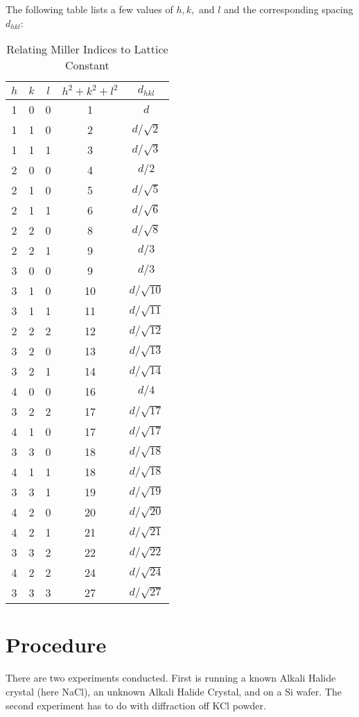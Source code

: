 \documentclass[letterpaper,12pt]{article}
\begin{document}
The following table lists a few values of $h,k,$ and $l$ and the corresponding spacing $d_{hkl}$:
\begin{table}[H]
  \centering
  \begin{tabular}{c|c|c|c|c}
    $h$ & $k$ & $l$ & $h^2+k^2+l^2$ & $d_{hkl}$ \\ \hline
    1 & 0 & 0 & 1  & $d$ \\
    1 & 1 & 0 & 2  & $d/\sqrt{2}$ \\
    1 & 1 & 1 & 3  & $d/\sqrt{3}$ \\
    2 & 0 & 0 & 4  & $d/2$ \\
    2 & 1 & 0 & 5  & $d/\sqrt{5}$ \\
    2 & 1 & 1 & 6  & $d/\sqrt{6}$ \\
    2 & 2 & 0 & 8  & $d/\sqrt{8}$ \\
    2 & 2 & 1 & 9  & $d/3$ \\
    3 & 0 & 0 & 9  & $d/3$ \\
    3 & 1 & 0 & 10 & $d/\sqrt{10}$ \\
    3 & 1 & 1 & 11 & $d/\sqrt{11}$ \\
    2 & 2 & 2 & 12 & $d/\sqrt{12}$ \\
    3 & 2 & 0 & 13 & $d/\sqrt{13}$ \\
    3 & 2 & 1 & 14 & $d/\sqrt{14}$ \\
    4 & 0 & 0 & 16 & $d/4$ \\
    3 & 2 & 2 & 17 & $d/\sqrt{17}$ \\
    4 & 1 & 0 & 17 & $d/\sqrt{17}$ \\
    3 & 3 & 0 & 18 & $d/\sqrt{18}$ \\
    4 & 1 & 1 & 18 & $d/\sqrt{18}$ \\
    3 & 3 & 1 & 19 & $d/\sqrt{19}$ \\
    4 & 2 & 0 & 20 & $d/\sqrt{20}$ \\
    4 & 2 & 1 & 21 & $d/\sqrt{21}$ \\
    3 & 3 & 2 & 22 & $d/\sqrt{22}$ \\
    4 & 2 & 2 & 24 & $d/\sqrt{24}$ \\
    3 & 3 & 3 & 27 & $d/\sqrt{27}$ 
  \end{tabular}
  \caption{Relating Miller Indices to Lattice Constant}
  \label{tab:1}
\end{table}

\section{Procedure}
There are two experiments conducted. First is running a known Alkali Halide crystal (here NaCl), an unknown Alkali Halide Crystal, and on a Si wafer. The second experiment has to do with diffraction off KCl powder.
\end{document}
